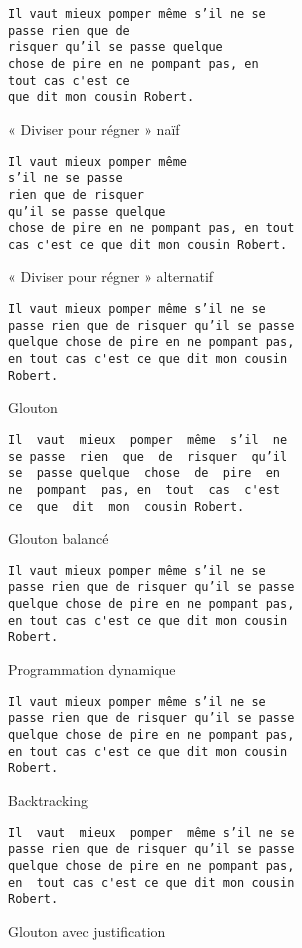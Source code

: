 \documentclass[a4paper, 11pt]{article}
\begin{document}
\begin{figure}[!h]
\begin{verbatim}
Il vaut mieux pomper même s’il ne se
passe rien que de
risquer qu’il se passe quelque
chose de pire en ne pompant pas, en
tout cas c'est ce
que dit mon cousin Robert.
\end{verbatim}
\caption{« Diviser pour régner » naïf}
\end{figure}

\begin{figure}[!h]
\begin{verbatim}
Il vaut mieux pomper même
s’il ne se passe
rien que de risquer
qu’il se passe quelque
chose de pire en ne pompant pas, en tout
cas c'est ce que dit mon cousin Robert.
\end{verbatim}
\caption{« Diviser pour régner » alternatif}
\end{figure}

\begin{figure}[!h]
\begin{verbatim}
Il vaut mieux pomper même s’il ne se
passe rien que de risquer qu’il se passe
quelque chose de pire en ne pompant pas,
en tout cas c'est ce que dit mon cousin
Robert.
\end{verbatim}
\caption{Glouton}
\end{figure}

\begin{figure}[!h]
\begin{verbatim}
Il  vaut  mieux  pomper  même  s’il  ne
se passe  rien  que  de  risquer  qu’il
se  passe quelque  chose  de  pire  en
ne  pompant  pas, en  tout  cas  c'est
ce  que  dit  mon  cousin Robert.
\end{verbatim}
\caption{Glouton balancé}
\end{figure}

\begin{figure}[!h]
\begin{verbatim}
Il vaut mieux pomper même s’il ne se
passe rien que de risquer qu’il se passe
quelque chose de pire en ne pompant pas,
en tout cas c'est ce que dit mon cousin
Robert.
\end{verbatim}
\caption{Programmation dynamique}
\end{figure}

\begin{figure}[!h]
\begin{verbatim}
Il vaut mieux pomper même s’il ne se
passe rien que de risquer qu’il se passe
quelque chose de pire en ne pompant pas,
en tout cas c'est ce que dit mon cousin
Robert.
\end{verbatim}
\caption{Backtracking}
\end{figure}

\begin{figure}[!h]
\begin{verbatim}
Il  vaut  mieux  pomper  même s’il ne se
passe rien que de risquer qu’il se passe
quelque chose de pire en ne pompant pas,
en  tout cas c'est ce que dit mon cousin
Robert.
\end{verbatim}
\caption{Glouton avec justification}
\end{figure}

\newpage


\end{document}
